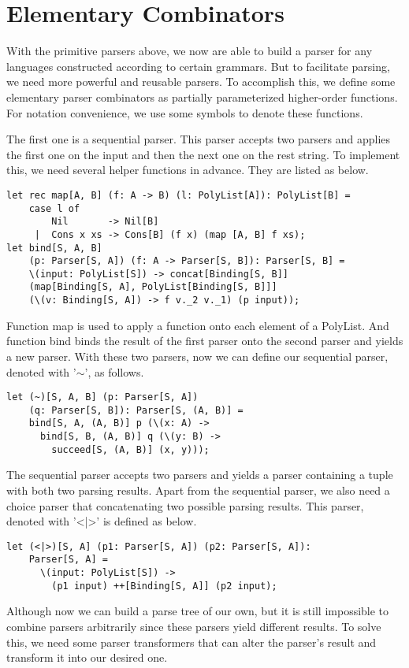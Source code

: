 \section{Elementary Combinators}
With the primitive parsers above, we now are able to build a parser for any languages constructed according to certain grammars. But to facilitate parsing, we need more powerful and reusable parsers. To accomplish this, we define some elementary parser combinators as partially parameterized higher-order functions. For notation convenience, we use some symbols to denote these functions.

The first one is a sequential parser. This parser accepts two parsers and applies the first one on the input and then the next one on the rest string. To implement this, we need several helper functions in advance. They are listed as below.
\begin{lstlisting}
let rec map[A, B] (f: A -> B) (l: PolyList[A]): PolyList[B] =
    case l of
        Nil       -> Nil[B]
     |  Cons x xs -> Cons[B] (f x) (map [A, B] f xs);
let bind[S, A, B] 
    (p: Parser[S, A]) (f: A -> Parser[S, B]): Parser[S, B] =
    \(input: PolyList[S]) -> concat[Binding[S, B]] 
    (map[Binding[S, A], PolyList[Binding[S, B]]] 
    (\(v: Binding[S, A]) -> f v._2 v._1) (p input));
\end{lstlisting}
Function map is used to apply a function onto each element of a PolyList. And function bind binds the result of the first parser onto the second parser and yields a new parser. With these two parsers, now we can define our sequential parser, denoted with '$\sim$', as follows.
\begin{lstlisting}
let (~)[S, A, B] (p: Parser[S, A]) 
    (q: Parser[S, B]): Parser[S, (A, B)] =
	bind[S, A, (A, B)] p (\(x: A) -> 
	  bind[S, B, (A, B)] q (\(y: B) -> 
	    succeed[S, (A, B)] (x, y)));
\end{lstlisting}
The sequential parser accepts two parsers and yields a parser containing a tuple with both two parsing results. Apart from the sequential parser, we also need a choice parser that concatenating two possible parsing results. This parser, denoted with '<|>' is defined as below.
\begin{lstlisting}
let (<|>)[S, A] (p1: Parser[S, A]) (p2: Parser[S, A]): 
    Parser[S, A] =
	  \(input: PolyList[S]) -> 
	    (p1 input) ++[Binding[S, A]] (p2 input);
\end{lstlisting}
Although now we can build a parse tree of our own, but it is still impossible to combine parsers arbitrarily since these parsers yield different results. To solve this, we need some parser transformers that can alter the parser's result and transform it into our desired one.

